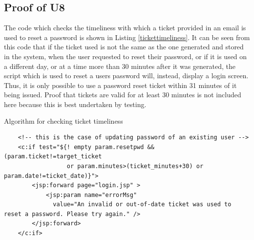 \subsection{Proof of U8}
The code which checks the timeliness with which a ticket provided in an email
is used to reset a password is shown in Listing \ref{tickettimeliness}. It can 
be seen from this code that if the ticket used is not the same as the one
generated and stored in the system, when the user requested to reset their password,
or if it is used on a different day, or at a time more than 30 minutes after it was
generated, the script which is used to reset a users password will, instead, display
a login screen. Thus, it is only possible to use a password reset ticket within 31 minutes
of it being issued. Proof that tickets are valid for at least 30 minutes is not included here
because this is best undertaken by testing.
\begin{listing}
\caption{Algorithm for checking ticket timeliness}\label{tickettimeliness}
{\footnotesize
\vspace{5mm}
\begin{verbatim}
    <!-- this is the case of updating password of an existing user -->
    <c:if test="${! empty param.resetpwd && (param.ticket!=target_ticket 
                  or param.minutes>(ticket_minutes+30) or param.date!=ticket_date)}">
        <jsp:forward page="login.jsp" >
            <jsp:param name="errorMsg"
              value="An invalid or out-of-date ticket was used to reset a password. Please try again." />
        </jsp:forward>        
    </c:if>		
\end{verbatim}
}
\end{listing}

	




